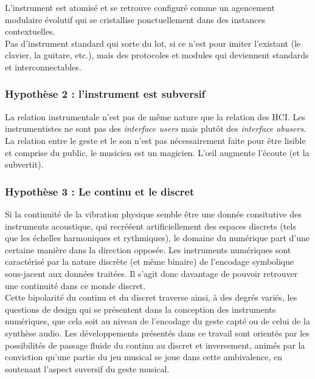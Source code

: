 L'instrument est atomisé et se retrouve configuré comme un agencement modulaire évolutif qui se cristallise ponctuellement dans des instances contextuelles. \\
Pas d'instrument standard qui sorte du lot, si ce n'est pour imiter l'existant (le clavier, la guitare, etc.), mais des protocoles et modules qui deviennent standards et interconnectables.

\subsubsection*{Hypothèse 2 : l'instrument est subversif}


La relation instrumentale n'est pas de même nature que la relation des HCI.
Les instrumentistes ne sont pas des \textit{interface users} mais plutôt des \textit{interface abusers}.
La relation entre le geste et le son n'est pas nécessairement faite pour être lisible et comprise du public, le musicien est un magicien.
L'œil augmente l'écoute (et la subvertit).


\subsubsection*{Hypothèse 3 : Le continu et le discret}

Si la continuité de la vibration physique semble être une donnée consitutive des instruments acoustique, qui recrééent artificiellement des espaces discrets (tels que les échelles harmoniques et rythmiques), le domaine du numérique part d'une certaine manière dans la direction opposée. Les instruments numériques sont caractérisé par la nature discrète (et même binaire) de l'encodage symbolique sous-jacent aux données traitées. Il s'agit donc davantage de pouvoir retrouver une continuité dans ce monde discret.\\
Cette bipolarité du continu et du discret traverse ainsi, à des degrés variés, les questions de design qui se présentent dans la conception des instruments numériques, que cela soit au niveau de l'encodage du geste capté ou de celui de la synthèse audio. Les développements présentés dans ce travail sont orientés par les possibilités de passage fluide du continu au discret et inversement, animés par la conviction qu'une partie du jeu musical se joue dans cette ambivalence, en soutenant l'aspect suversif du geste musical.


